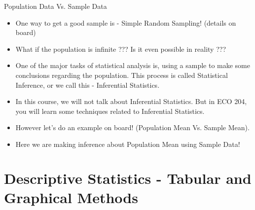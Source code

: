 \documentclass[8pt, usepdftitle=false]{beamer}
\begin{document}
\begin{frame}[allowframebreaks]{Population Data Vs. Sample Data}
\begin{itemize}
  \item One way to get a good sample is - \alert{Simple Random Sampling!} (details on board)

  \item What if the population is infinite ??? Is it even possible in reality ???

  \item
  One of the major tasks of statistical analysis is, using a sample to make some conclusions regarding the population. This process is called \alert{Statistical Inference}, or we call this - \alert{Inferential Statistics}.

  \item In this course, we will not talk about Inferential Statistics. But in ECO 204, you will learn some techniques related to Inferential Statistics. 

  \item However let's do an example on board! (Population Mean Vs. Sample Mean).

  \item Here we are making inference about Population Mean using Sample Data!



\end{itemize}

\end{frame}








\section{Descriptive Statistics - Tabular and Graphical Methods}
\frame{\sectionpage}
\end{document}
